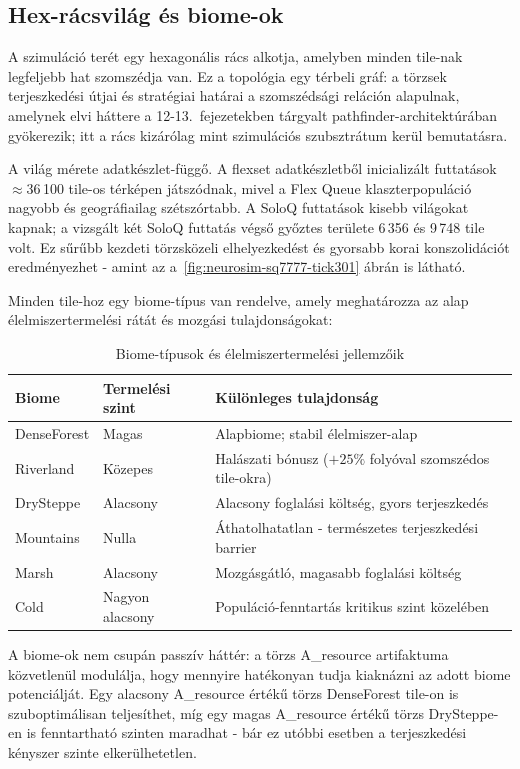 ﻿\documentclass[a4paper,12pt]{report}
\begin{document}
\subsection*{Hex-rácsvilág és biome-ok}

A szimuláció terét egy hexagonális rács alkotja, amelyben minden tile-nak legfeljebb hat szomszédja van. Ez a topológia egy térbeli gráf: a törzsek terjeszkedési útjai és stratégiai határai a szomszédsági reláción alapulnak, amelynek elvi háttere a 12-13.~fejezetekben tárgyalt pathfinder-architektúrában gyökerezik; itt a rács kizárólag mint szimulációs szubsztrátum kerül bemutatásra.

A világ mérete adatkészlet-függő. A flexset adatkészletből inicializált futtatások $\approx$36\,100 tile-os térképen játszódnak, mivel a Flex Queue klaszterpopuláció nagyobb és geográfiailag szétszórtabb. A SoloQ futtatások kisebb világokat kapnak; a vizsgált két SoloQ futtatás végső győztes területe 6\,356 és 9\,748 tile volt. Ez sűrűbb kezdeti törzsközeli elhelyezkedést és gyorsabb korai konszolidációt eredményezhet - amint az a~\ref{fig:neurosim-sq7777-tick301} ábrán is látható.

Minden tile-hoz egy biome-típus van rendelve, amely meghatározza az alap élelmiszertermelési rátát és mozgási tulajdonságokat:

\begin{table}[h]
\centering
\caption{Biome-típusok és élelmiszertermelési jellemzőik}
\label{tab:biomes}
\begin{tabular}{lll}
\hline
\textbf{Biome} & \textbf{Termelési szint} & \textbf{Különleges tulajdonság} \\
\hline
DenseForest & Magas        & Alapbiome; stabil élelmiszer-alap \\
Riverland   & Közepes      & Halászati bónusz ($+25\%$ folyóval szomszédos tile-okra) \\
DrySteppe   & Alacsony     & Alacsony foglalási költség, gyors terjeszkedés \\
Mountains   & Nulla        & Áthatolhatatlan - természetes terjeszkedési barrier \\
Marsh       & Alacsony     & Mozgásgátló, magasabb foglalási költség \\
Cold        & Nagyon alacsony & Populáció-fenntartás kritikus szint közelében \\
\hline
\end{tabular}
\end{table}

A biome-ok nem csupán passzív háttér: a törzs A\_resource artifaktuma közvetlenül modulálja, hogy mennyire hatékonyan tudja kiaknázni az adott biome potenciálját. Egy alacsony A\_resource értékű törzs DenseForest tile-on is szuboptimálisan teljesíthet, míg egy magas A\_resource értékű törzs DrySteppe-en is fenntartható szinten maradhat - bár ez utóbbi esetben a terjeszkedési kényszer szinte elkerülhetetlen.
\end{document}
